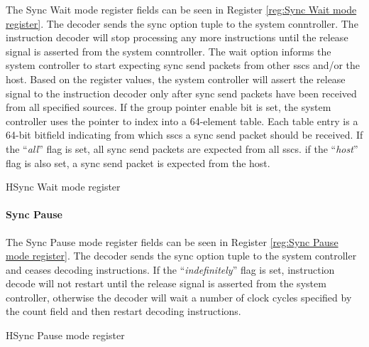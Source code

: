 The Sync Wait mode register fields can be seen in Register \ref{reg:Sync Wait mode register}.
The decoder sends the sync option tuple to the system conntroller.
The instruction decoder will stop processing any more instructions until the release signal is asserted from the system conntroller.
The wait option informs the system controller to start expecting sync send packets from other \acp{ssc} and/or the host.
Based on the register values, the system controller will assert the release signal to the instruction decoder only after sync send packets have been received from all specified sources.
If the group pointer enable bit is set, the system controller uses the pointer to index into a 64-element table. 
Each table entry is a 64-bit bitfield indicating from which \acp{ssc} a sync send packet should be received.
If the ``{\textit{all}}'' flag is set, all sync send packets are expected from all \acp{ssc}.
if the ``{\textit{host}}'' flag is also set, a sync send packet is expected from the host.
\begin{register}{H}{Sync Wait mode register}{}%
  \label{reg:Sync Wait mode register}
  \vspace{-20pt}
\end{register}


\paragraph{Sync Pause}

The Sync Pause mode register fields can be seen in Register \ref{reg:Sync Pause mode register}.
The decoder sends the sync option tuple to the system controller and ceases decoding instructions.
If the ``{\textit{indefinitely}}'' flag is set, instruction decode will not restart until the release signal is asserted from the system controller, otherwise the decoder will wait a number of clock cycles specified by the count field and then restart decoding instructions.
\begin{register}{H}{Sync Pause mode register}{}%
  \label{reg:Sync Pause mode register}
  \vspace{-10pt}
\end{register}

